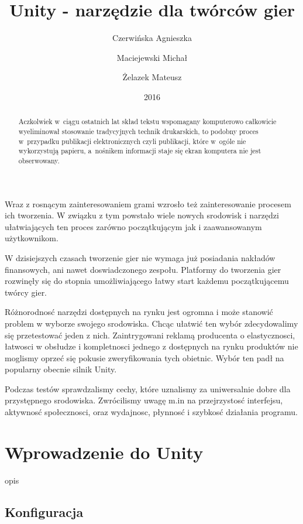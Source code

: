 \documentclass[brudnopis]{xmgr}
\author   {Czerwińska Agnieszka}
\author   {Maciejewski Michał}
\author   {Żelazek Mateusz}
\title    {Unity - narzędzie dla twórców gier}
\date     {2016}
\begin{document}
\begin{abstract}
  Aczkolwiek w~ciągu ostatnich lat skład tekstu wspomagany komputerowo
  całkowicie wyeliminował stosowanie tradycyjnych technik drukarskich,
  to podobny proces w~przypadku publikacji elektronicznych czyli
  publikacji, które w~ogóle nie wykorzystują papieru, a~nośnikem
  informacji staje się ekran komputera nie jest obserwowany.
\end{abstract}


\maketitle

\introduction

Wraz z rosnącym zainteresowaniem grami wzrosło też zainteresowanie procesem ich tworzenia. W związku z tym powstało wiele nowych srodowisk i narzędzi ułatwiających ten proces zarówno początkującym jak i zaawansowanym użytkownikom. 

W dzisiejszych czasach tworzenie gier nie wymaga już posiadania nakładów finansowych, ani nawet doswiadczonego zespołu. Platformy do tworzenia gier rozwinęły się do stopnia umożliwiającego łatwy start każdemu początkującemu twórcy gier.  

Różnorodnosć narzędzi dostępnych na rynku jest ogromna i może stanowić problem w wyborze swojego srodowiska. Chcąc ułatwić ten wybór zdecydowalimy się przetestować jeden z nich. Zaintrygowani reklamą producenta o elastycznosci, łatwosci w obsłudze i kompletnosci jednego z dostępnych na rynku  produktów nie moglismy oprzeć się pokusie zweryfikowania tych obietnic. Wybór ten padł na popularny obecnie silnik Unity.

Podczas testów sprawdzalismy cechy, które uznalismy za uniwersalnie dobre dla przystępnego srodowiska. Zwrócilismy uwagę m.in na przejrzystosć interfejsu, aktywnosć społecznosci, oraz wydajnosc, płynnosć i szybkosć działania programu.

\chapter{Wprowadzenie do Unity}

opis

\section{Konfiguracja}
\end{document}
